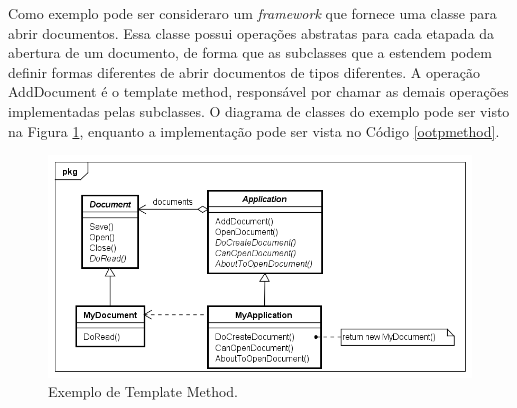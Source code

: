 Como exemplo pode ser consideraro um \textit{framework} que fornece uma classe para abrir documentos. Essa classe possui operações abstratas para cada etapada da abertura de um documento, de forma que as subclasses que a estendem podem definir formas diferentes de abrir documentos de tipos diferentes. A operação AddDocument é o template method, responsável por chamar as demais operações implementadas pelas subclasses. 
O diagrama de classes do exemplo pode ser visto na Figura \ref{tpmethod_exemplo}, 
enquanto a implementação pode ser vista no Código \ref{ootpmethod}.

\begin{figure}[htb]
	\caption{\label{tpmethod_exemplo}Exemplo de Template Method.}
	\begin{center}
	    \includegraphics[scale=0.5]{5_padroes-contexto-funcional/5.3_comportamentais/5.3.10_template-method/templatemethod_exemplo.png}
	\end{center}
\end{figure}

